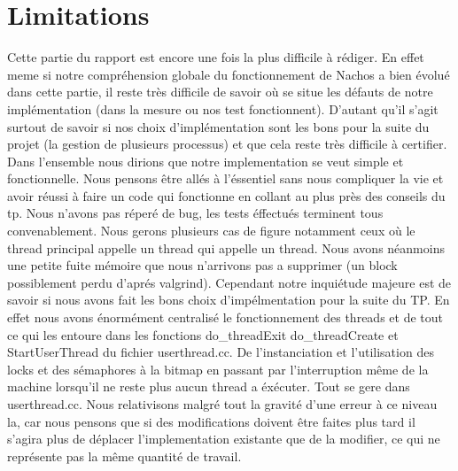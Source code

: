\documentclass[12pt]{article}
\begin{document}
\section{Limitations}

Cette partie du rapport est encore une fois la plus difficile à rédiger. En effet
meme si notre compréhension globale du fonctionnement de Nachos a bien évolué dans
cette partie, il reste très difficile de savoir où se situe les défauts de notre
implémentation (dans la mesure ou nos test fonctionnent). D'autant qu'il s'agit surtout
de savoir si nos choix d'implémentation sont les bons pour la suite du projet (la gestion
de plusieurs processus) et que cela reste très difficile à certifier.
\newline
\newline
Dans l'ensemble nous dirions que notre implementation se veut simple et fonctionnelle.
Nous pensons être allés à l'éssentiel sans nous compliquer la vie et avoir réussi à faire
un code qui fonctionne en collant au plus près des conseils du tp.
Nous n'avons pas réperé de bug, les tests éffectués terminent tous convenablement. Nous gerons plusieurs
cas de figure notamment ceux où le thread principal appelle un thread qui appelle un thread.
\newline
\newline
Nous avons néanmoins une petite fuite mémoire que nous n'arrivons pas a
supprimer (un block possiblement perdu d'aprés valgrind).
Cependant notre inquiétude majeure est de savoir si nous avons fait les bons choix d'impélmentation
pour la suite du TP. En effet nous avons énormément centralisé le fonctionnement des
threads et de tout ce qui les entoure dans les fonctions do\_threadExit
do\_threadCreate et StartUserThread du fichier userthread.cc.
De l'instanciation et l'utilisation des locks et des sémaphores à la bitmap en passant par
l'interruption même de la machine lorsqu'il ne reste plus aucun thread a éxécuter. Tout
se gere dans userthread.cc.
Nous relativisons malgré tout la gravité d'une erreur à ce niveau la, car nous pensons que si
des modifications doivent être faites plus tard il s'agira plus de déplacer l'implementation existante que de
la modifier, ce qui ne représente pas la même quantité de travail.
\end{document}
